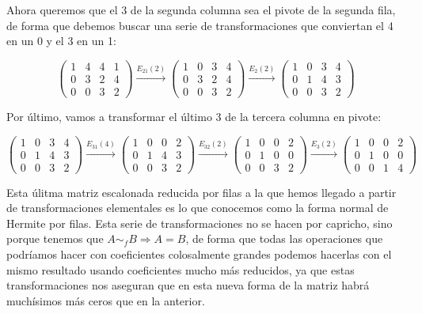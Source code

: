 Ahora queremos que el 3 de la segunda columna sea el pivote de la segunda fila, de forma que debemos buscar una serie de transformaciones que conviertan el 4 en un 0 y el 3 en un 1:

\[
	\begin{pmatrix}
		1 & 4 & 4 & 1 \\
		0 & 3 & 2 & 4 \\
		0 & 0 & 3 & 2
	\end{pmatrix}
	\xrightarrow{E_{21}(2)}
	\begin{pmatrix}
		1 & 0 & 3 & 4 \\
		0 & 3 & 2 & 4 \\
		0 & 0 & 3 & 2
	\end{pmatrix}
	\xrightarrow{E_{2}(2)}
	\begin{pmatrix}
		1 & 0 & 3 & 4 \\
		0 & 1 & 4 & 3 \\
		0 & 0 & 3 & 2
	\end{pmatrix}
\]

Por último, vamos a transformar el último 3 de la tercera columna en pivote:

\[
	\begin{pmatrix}
		1 & 0 & 3 & 4 \\
		0 & 1 & 4 & 3 \\
		0 & 0 & 3 & 2
	\end{pmatrix}
	\xrightarrow{E_{31}(4)}
	\begin{pmatrix}
		1 & 0 & 0 & 2 \\
		0 & 1 & 4 & 3 \\
		0 & 0 & 3 & 2
	\end{pmatrix}
	\xrightarrow{E_{32}(2)}
	\begin{pmatrix}
		1 & 0 & 0 & 2 \\
		0 & 1 & 0 & 0 \\
		0 & 0 & 3 & 2
	\end{pmatrix}
	\xrightarrow{E_{3}(2)}
	\begin{pmatrix}
		1 & 0 & 0 & 2 \\
		0 & 1 & 0 & 0 \\
		0 & 0 & 1 & 4
	\end{pmatrix}
\]

Esta úlitma matriz escalonada reducida por filas a la que hemos llegado a partir de transformaciones elementales es lo que conocemos como la forma normal de Hermite por filas.
Esta serie de transformaciones no se hacen por capricho, sino porque tenemos que $A \sim_f B \Rightarrow A = B$, de forma que todas las operaciones que podríamos hacer con coeficientes colosalmente grandes podemos hacerlas con el mismo resultado usando coeficientes mucho más reducidos, ya que estas transformaciones nos aseguran que en esta nueva forma de la matriz habrá muchísimos más ceros que en la anterior.

